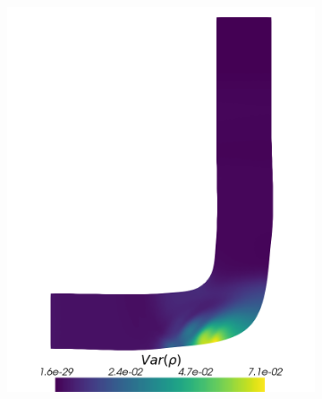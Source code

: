 \begin{figure}[H]
\begin{subfigure}{0.31\linewidth}
		\includegraphics[width=\linewidth]{figs/pipe/euler2D_pipe_n1-4_tg1-3_VarRho.png}
		\caption{}
		\label{fig:adIPMSolutionsPipeTGVar}
	\end{subfigure}
	\hfill
	\begin{subfigure}{0.31\linewidth}
		\centering

\end{subfigure}
\end{figure}
